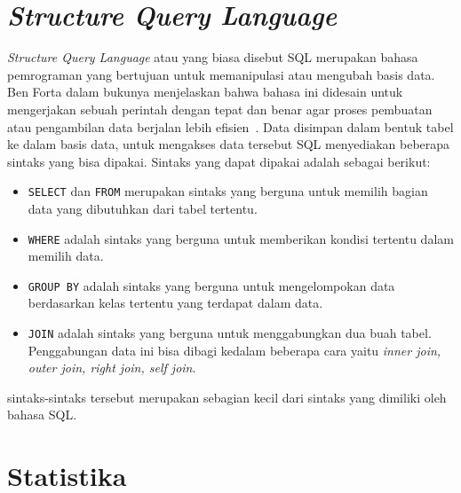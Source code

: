 \section{\textit{Structure Query Language}}
\label{sec:sql}
\textit{Structure Query Language} atau yang biasa disebut SQL merupakan bahasa pemrograman yang bertujuan untuk memanipulasi atau mengubah basis data. Ben Forta dalam bukunya menjelaskan bahwa bahasa ini didesain untuk mengerjakan sebuah perintah dengan tepat dan benar agar proses pembuatan atau pengambilan data berjalan lebih efisien~\cite{ben}. Data disimpan dalam bentuk tabel ke dalam basis data, untuk mengakses data tersebut SQL menyediakan beberapa sintaks yang bisa dipakai. Sintaks yang dapat dipakai adalah sebagai berikut:
\begin{itemize}
    \item \verb|SELECT| dan \verb|FROM| merupakan sintaks yang berguna untuk memilih bagian data yang dibutuhkan dari tabel tertentu.
    \item \verb|WHERE| adalah sintaks yang berguna untuk memberikan kondisi tertentu dalam memilih data.
    \item \verb|GROUP BY| adalah sintaks yang berguna untuk mengelompokan data berdasarkan kelas tertentu yang terdapat dalam data.
    \item \verb|JOIN| adalah sintaks yang berguna untuk menggabungkan dua buah tabel. Penggabungan data ini bisa dibagi kedalam beberapa cara yaitu \textit{inner join, outer join, right join, self join}.
\end{itemize}
sintaks-sintaks tersebut merupakan sebagian kecil dari sintaks yang dimiliki oleh bahasa SQL.

\section{Statistika~\cite{han:22:datmin}}
\label{sec:stat}


